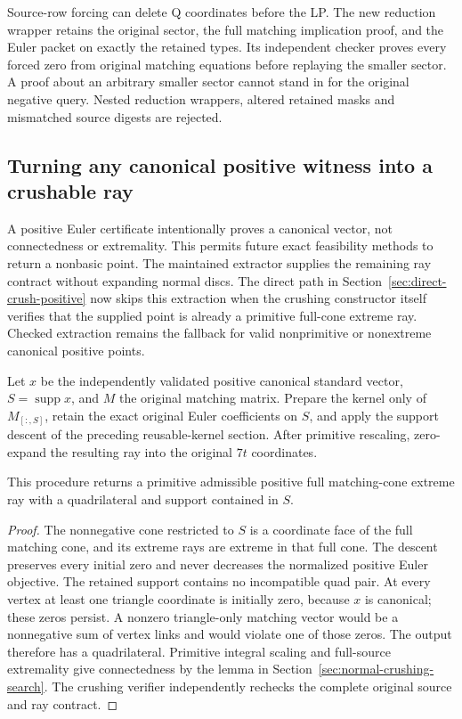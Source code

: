 Source-row forcing can delete Q coordinates before the LP.  The new
reduction wrapper retains the original sector, the full matching implication
proof, and the Euler packet on exactly the retained types.  Its independent
checker proves every forced zero from original matching equations before
replaying the smaller sector.  A proof about an arbitrary smaller sector
cannot stand in for the original negative query.  Nested reduction wrappers,
altered retained masks and mismatched source digests are rejected.

\subsection{Turning any canonical positive witness into a crushable ray}

A positive Euler certificate intentionally proves a canonical vector, not
connectedness or extremality.  This permits future exact feasibility
methods to return a nonbasic point.  The maintained extractor supplies the
remaining ray contract without expanding normal discs.  The direct path in
Section~\ref{sec:direct-crush-positive} now skips this extraction when the
crushing constructor itself verifies that the supplied point is already a
primitive full-cone extreme ray.  Checked extraction remains the fallback
for valid nonprimitive or nonextreme canonical positive points.

Let $x$ be the independently validated positive canonical standard vector,
$S=\operatorname{supp}x$, and $M$ the original matching matrix.  Prepare the
kernel only of $M_{[:,S]}$, retain the exact original Euler coefficients on
$S$, and apply the support descent of the preceding reusable-kernel section.
After primitive rescaling, zero-expand the resulting ray into the original
$7t$ coordinates.

\begin{proposition}
This procedure returns a primitive admissible positive full matching-cone
extreme ray with a quadrilateral and support contained in $S$.
\end{proposition}
\begin{proof}
The nonnegative cone restricted to $S$ is a coordinate face of the full
matching cone, and its extreme rays are extreme in that full cone.  The
descent preserves every initial zero and never decreases the normalized
positive Euler objective.  The retained support contains no incompatible
quad pair.  At every vertex at least one triangle coordinate is initially
zero, because $x$ is canonical; these zeros persist.  A nonzero triangle-only
matching vector would be a nonnegative sum of vertex links and would violate
one of those zeros.  The output therefore has a quadrilateral.  Primitive
integral scaling and full-source extremality give connectedness by the
lemma in Section~\ref{sec:normal-crushing-search}.  The crushing verifier
independently rechecks the complete original source and ray contract.
\end{proof}

